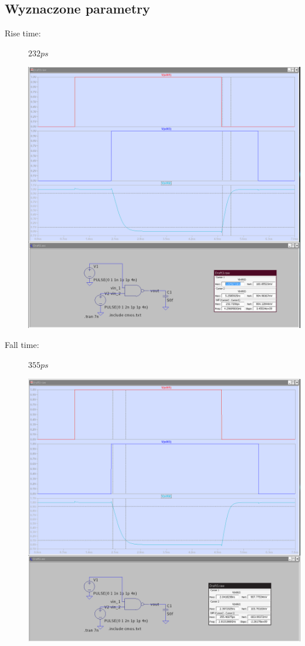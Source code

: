 \documentclass[a4paper, 11pt]{article}
\begin{document}
\subsection{Wyznaczone parametry}\label{sub:wyznaczone_parametry} %
\begin{description}
	\item[Rise time:] $232ps$ \hfill
	      \begin{center}
		      \includegraphics[scale=0.20]{images/rise_time.png}
	      \end{center}
	\item[Fall time:] $355ps$ \hfill
	      \begin{center}
		      \includegraphics[scale=0.20]{images/fall_time.png}

\end{center}
\end{description}
\end{document}

